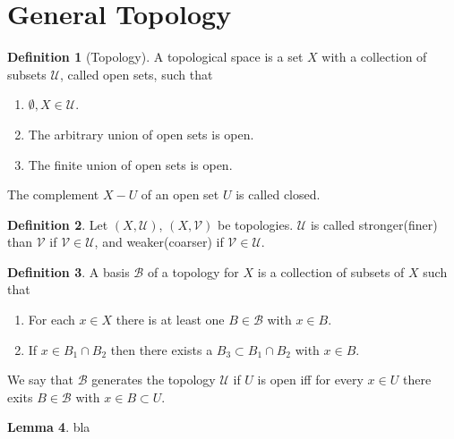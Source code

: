 \documentclass[twocolumn]{article}
\theoremstyle{definition}
\newtheorem{definition}{Definition}[section]
\newtheorem{lemma}[definition]{Lemma}
\begin{document}
\section{General Topology}
\begin{definition}[Topology]
    A topological space is a set $X$ with a collection of subsets $\mathcal{U}$, called open sets, such that
    \begin{enumerate}[noitemsep]
        \item $\emptyset, X \in \mathcal{U}$.
        \item The arbitrary union of open sets is open.
        \item The finite union of open sets is open.
    \end{enumerate}
    The complement $X - U$ of an open set $U$ is called closed.
\end{definition}
\begin{definition}
    Let $(X, \mathcal{U})$, $(X, \mathcal{V})$ be topologies.
    $\mathcal{U}$ is called stronger(finer) than $\mathcal{V}$ if $\mathcal{V} \in \mathcal{U}$,
    and weaker(coarser) if $\mathcal{V} \in \mathcal{U}$.
\end{definition}
\begin{definition}
    A basis $\mathcal{B}$ of a topology for $X$ is a collection of subsets of $X$ such that
    \begin{enumerate}[noitemsep]
        \item For each $x \in X$ there is at least one $B \in \mathcal{B}$ with $x \in B$.
        \item If $x \in B_1 \cap B_2$ then there exists a $B_3 \subset B_1 \cap B_2$ with $x \in B$.
    \end{enumerate}
    We say that $\mathcal{B}$ generates the topology $\mathcal{U}$ if $U$ is open iff for every $x \in U$ there exits $B \in \mathcal{B}$ with $x \in B \subset U$.
\end{definition}
\begin{lemma}
    bla
\end{lemma}
\end{document}
